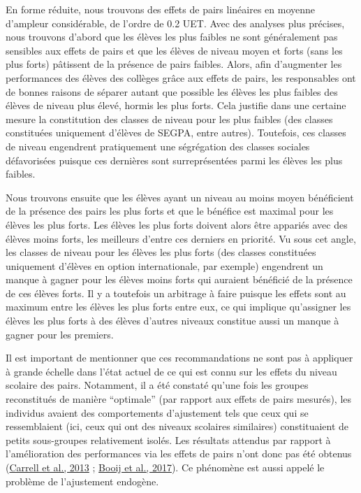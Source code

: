 \documentclass[
]{book}
\begin{document}
\quad En forme réduite, nous trouvons des effets de pairs linéaires en moyenne d'ampleur considérable, de l'ordre de 0.2 UET.
Avec des analyses plus précises, nous trouvons d'abord que les élèves les plus faibles ne sont généralement pas sensibles aux effets de pairs et que les élèves de niveau moyen et forts (sans les plus forts) pâtissent de la présence de pairs faibles. Alors, afin d'augmenter les performances des élèves des collèges grâce aux effets de pairs, les responsables ont de bonnes raisons de séparer autant que possible les élèves les plus faibles des élèves de niveau plus élevé, hormis les plus forts. Cela justifie dans une certaine mesure la constitution des classes de niveau pour les plus faibles (des classes constituées uniquement d'élèves de SEGPA, entre autres). Toutefois, ces classes de niveau engendrent pratiquement une ségrégation des classes sociales défavorisées puisque ces dernières sont surreprésentées parmi les élèves les plus faibles.

Nous trouvons ensuite que les élèves ayant un niveau au moins moyen bénéficient de la présence des pairs les plus forts et que le bénéfice est maximal pour les élèves les plus forts. Les élèves les plus forts doivent alors être appariés avec des élèves moins forts, les meilleurs d'entre ces derniers en priorité. Vu sous cet angle, les classes de niveau pour les élèves les plus forts (des classes constituées uniquement d'élèves en option internationale, par exemple) engendrent un manque à gagner pour les élèves moins forts qui auraient bénéficié de la présence de ces élèves forts. Il y a toutefois un arbitrage à faire puisque les effets sont au maximum entre les élèves les plus forts entre eux, ce qui implique qu'assigner les élèves les plus forts à des élèves d'autres niveaux constitue aussi un manque à gagner pour les premiers.

\quad Il est important de mentionner que ces recommandations ne sont pas à appliquer à grande échelle dans l'état actuel de ce qui est connu sur les effets du niveau scolaire des pairs. Notamment, il a été constaté qu'une fois les groupes reconstitués de manière ``optimale'' (par rapport aux effets de pairs mesurés), les individus avaient des comportements d'ajustement tels que ceux qui se ressemblaient (ici, ceux qui ont des niveaux scolaires similaires) constituaient de petits sous-groupes relativement isolés. Les résultats attendus par rapport à l'amélioration des performances via les effets de pairs n'ont donc pas été obtenus (\protect\hyperlink{ref-CAR:eal:13}{Carrell et al., 2013} ; \protect\hyperlink{ref-BOO:eal:17}{Booij et al., 2017}). Ce phénomène est aussi appelé le problème de l'ajustement endogène.
\end{document}
